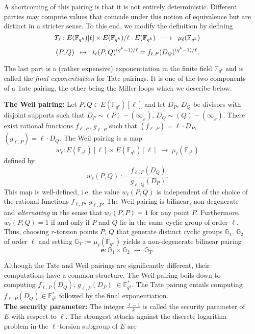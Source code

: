 \documentclass[11pt, lettersize, notitlepage, leqno, footskip=0.6cm]{article}
\newcommand{\bF}{\mathbb F}
\newcommand{\bFqk}{\mathbb{F}_{q^k}}
\newcommand{\lra}{\longrightarrow}
\newcommand{\mb}{\mathbb}
\newcommand{\e}{\mathbf{e}}
\newcommand{\vs}{\vspace{-2mm}}
\newcommand{\noin}{\noindent}
\numberwithin{equation}{section}
\begin{document}
A shortcoming of this pairing is that it is not entirely deterministic. Different parties may compute values that coincide under this notion of equivalence   but are distinct in a stricter sense. To this end, we modify the definition by defining \vs $$T_{\ell} : E(\bF _ {q^k})[\ell]\times E(\bF _ {q^k})/\ell \cdot E(\bF _ {q^k})\;\;\lra\;\; \mu_{\ell}(\bF _ {q^k})\vs $$ \vs $$(P,Q)\;\;\mapsto\;\; t_{\ell}(P,Q)^{(q^k-1)/\ell} = f_{\ell, P}(D_Q)^{(q^k-1)/\ell}. \vs $$  

\noin The last part is a (rather expensive) exponentiation in the finite field $\bF _ {q^k}$ and is called the \textit{final exponentiation} for Tate pairings. It is one of the two components of a Tate pairing, the other being the Miller loops which we describe below. 



    
\bigskip



\noin \textbf{The Weil pairing:} Let $P, Q \in E(\bFqk)[\ell]$ and let $D_P$, $D_Q$ be divisors with disjoint supports such that $D_P \sim (P) - (\infty_{_E}) $, $D_Q \sim (Q) - (\infty_{_E}) $. There exist rational functions $f_{\ell,P}$, $g_{\ell,P}$ such that $(f_{\ell,P}) = \ell \cdot D_P$, $(g_{\ell,P}) = \ell \cdot D_Q$. The Weil pairing is a map \vs $$w_{\ell}: E(\bFqk)[\ell]\times E(\bFqk)[\ell]\;\lra \; \mu_{\ell}(\bFqk) $$ defined by \vs $$w_{\ell}(P,Q):= \frac{f_{\ell,P}(D_Q)}{g_{\ell,Q}(D_P)}. $$ This map is well-defined, i.e. the value $w_{\ell}(P,Q)$ is independent of the choice of the rational functions $f_{\ell,P}$, $g_{\ell,P}$. The Weil pairing is bilinear, non-degenerate and \textit{alternating} in the sense that $w_{\ell}(P,P) = 1$ for any point $P$. Furthermore, $w_{\ell}(P,Q) = 1$ if and only if $P$ and $Q$ lie in the same cyclic group of order $\ell$. Thus, choosing $r$-torsion points $P$, $Q$ that generate distinct cyclic groups $\mb{G}_1$, $\mb{G}_2$ of order $\ell$ and setting $\mb{G}_T:= \mu_{\ell}(\bFqk)$ yields a non-degenerate bilinear pairing \vs $$\e: \mb{G}_1\times\mb{G}_2 \;\lra\; \mb{G}_T . $$    

Although the Tate and Weil pairings are significantly different, their computations have a common structure. The Weil pairing boils down to computing $f_{\ell,P}(D_Q)$, $g_{\ell,P}(D_P)$ $\in \bFqk^*$. The Tate pairing entails computing $f_{\ell,P}(D_Q)\in \bFqk^*$ followed by the final exponentiation.\\


\noin \textbf{The security parameter:} The integer $\frac{\ell-1}{k}$ is called the security parameter of $E$ with respect to $\ell$. The strongest attacks against the discrete logarithm problem in the $\ell$-torsion subgroup of $E$ are 
\end{document}
